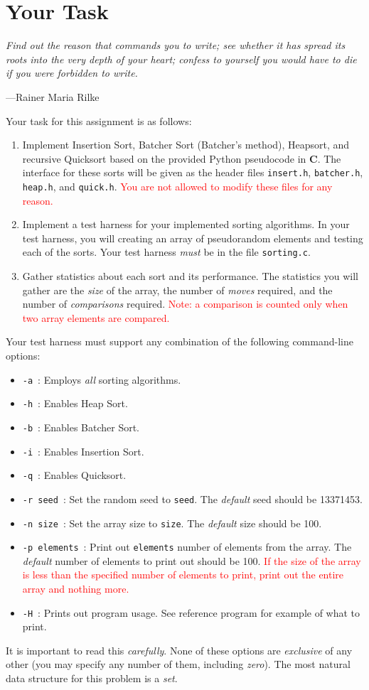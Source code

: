 \section{Your Task}\label{task}

\epigraph{\emph{Find out the reason that commands you to write; see whether it has spread its roots into the very depth of your heart; confess to yourself you would have to die if you were forbidden to write.}}{---Rainer Maria Rilke}

\noindent Your task for this assignment is as follows:

\begin{enumerate}
  \item Implement Insertion Sort, Batcher Sort (Batcher's method), Heapsort, and
    recursive Quicksort based on the provided Python pseudocode in \textbf{C}.
    The interface for these sorts will be given as the header files
    \texttt{insert.h}, \texttt{batcher.h}, \texttt{heap.h}, and \texttt{quick.h}.
    \textcolor{red}{You are not allowed to modify these files for any reason.}
  \item Implement a test harness for your implemented sorting
    algorithms. In your test harness, you will creating an array of
    pseudorandom elements and testing each of the sorts. Your test harness
    \emph{must} be in the file \texttt{sorting.c}.
  \item Gather statistics about each sort and its performance. The
    statistics you will gather are the \emph{size} of the array, the
    number of \emph{moves} required, and the number of
    \emph{comparisons} required. \textcolor{red}{Note: a comparison is
    counted only when two array elements are compared.}
\end{enumerate}

Your test harness must support any combination of the following
command-line options:

\begin{itemize}
  \item \texttt{-a}\ : Employs \emph{all} sorting algorithms.
  \item \texttt{-h}\ : Enables Heap Sort.
  \item \texttt{-b}\ : Enables Batcher Sort.
  \item \texttt{-i}\ : Enables Insertion Sort.
  \item \texttt{-q}\ : Enables Quicksort.
  \item \texttt{-r seed}\ : Set the random seed to \texttt{seed}.
    The \emph{default} seed should be 13371453.
  \item \texttt{-n size}\ : Set the array size to \texttt{size}. The
    \emph{default} size should be 100.
  \item \texttt{-p elements}\ : Print out \texttt{elements} number of
    elements from the array. The \emph{default} number of elements to
    print out should be 100. \textcolor{red}{If the size of the array is
      less than the specified number of elements to print, print out the
    entire array and nothing more.}
  \item \texttt{-H}\ : Prints out program usage. See reference program
    for example of what to print.
\end{itemize}

It is important to read this \emph{carefully}. None of these options are
\emph{exclusive} of any other (you may specify any number of them,
including \emph{zero}). The most natural data structure for this
problem is a \emph{set}.
